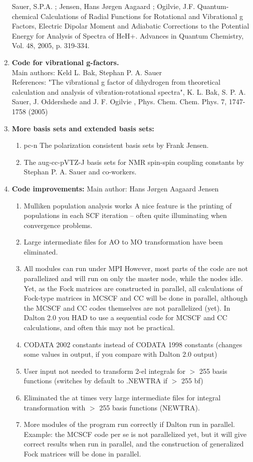 \begin{enumerate}
Sauer, S.P.A. ; Jensen, Hans J\o rgen Aagaard ; Ogilvie, J.F.
Quantum-chemical Calculations of Radial Functions for Rotational and
Vibrational g Factors, Electric Dipolar Moment and Adiabatic Corrections
to the Potential Energy for Analysis of Spectra of HeH+.
Advances in Quantum Chemistry, Vol. 48, 2005, p. 319-334.


\item{\bf Code for vibrational g-factors.}  \\
Main authors: Keld L. Bak, Stephan P. A. Sauer\\
   References: "The vibrational g factor of dihydrogen from theoretical calculation
   and analysis of vibration-rotational spectra", K. L. Bak, S. P. A. Sauer, J. Oddershede and J. F. Ogilvie ,
   Phys. Chem. Chem. Phys. 7, 1747-1758 (2005)

\item{\bf More basis sets and extended basis sets:}
\begin{enumerate}
  \item{pc-n} The polarization consistent basis sets by Frank Jensen.
  \item{The aug-cc-pVTZ-J} basis sets for NMR spin-spin coupling constants by Stephan P. A. Sauer and co-workers.
\end{enumerate}

\item{\bf Code improvements:}
Main author: Hans J\o rgen Aagaard Jensen
\begin{enumerate}
  \item{Mulliken population analysis works} A nice feature is the printing of populations in each
   SCF iteration -- often quite illuminating when convergence problems.
  \item{Large intermediate files for AO to MO transformation have been eliminated.}
  \item{All modules can run under MPI} However, most parts of the code are not parallelized and will run
    on only the master node, while the nodes idle. Yet, as the Fock matrices are constructed in parallel,
    all calculations of Fock-type matrices in MCSCF and CC will be done in parallel, although the MCSCF and CC
    codes themselves are not parallelized (yet). In Dalton 2.0 you HAD to use a sequential code for MCSCF and CC
    calculations, and often this may not be practical.
  \item{} CODATA 2002 constants instead of CODATA 1998 constants
    (changes some values in output, if you compare with Dalton 2.0 output)
  \item{} User input not needed to transform 2-el integrals for $>$ 255 basis functions
    (switches by default to .NEWTRA if $>$ 255 bf)
  \item{} Eliminated the at times very large intermediate files for integral transformation
    with $>$ 255 basis functions (NEWTRA).
  \item{} More modules of the program run correctly if Dalton run in parallel.
    Example: the MCSCF code per se is not parallelized yet, but it will
    give correct results when run in parallel, and the construction of
    generalized Fock matrices will be done in parallel.
\end{enumerate}


\end{enumerate}
